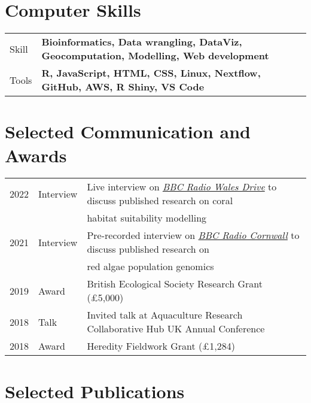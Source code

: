 \documentclass[10pt,a4paper,]{article}
\begin{document}
\vspace{12pt}

\hypertarget{computer-skills}{%
\section{Computer Skills}\label{computer-skills}}

\begin{tabular}{ll}
  Skill & \textbf{Bioinformatics, Data wrangling, DataViz, Geocomputation, Modelling, Web development} \\ 
  Tools & \textbf{R, JavaScript, HTML, CSS, Linux, Nextflow, GitHub, AWS, R Shiny, VS Code} \\ 
  \end{tabular}

\vspace{12pt}

\hypertarget{selected-communication-and-awards}{%
\section{Selected Communication and
Awards}\label{selected-communication-and-awards}}

\begin{tabular}{rll}
  2022 & Interview & Live interview on \href{https://www.bbc.co.uk/news/uk-england-devon-61592108}{\textit{BBC Radio Wales Drive}} to discuss published research on coral  \\ 
   &  & habitat suitability modelling \\ 
  2021 & Interview & Pre-recorded interview on \href{https://www.bbc.co.uk/news/uk-england-cornwall-56586904}{\textit{BBC Radio Cornwall}} to discuss published research on \\ 
   &  & red algae population genomics \\ 
  2019 & Award & British Ecological Society Research Grant (£5,000) \\ 
  2018 & Talk & Invited talk at Aquaculture Research Collaborative Hub UK Annual Conference \\ 
  2018 & Award & Heredity Fieldwork Grant (£1,284) \\ 
  \end{tabular}

\vspace{12pt}

\hypertarget{selected-publications}{%
\section{Selected Publications}\label{selected-publications}}
\end{document}
